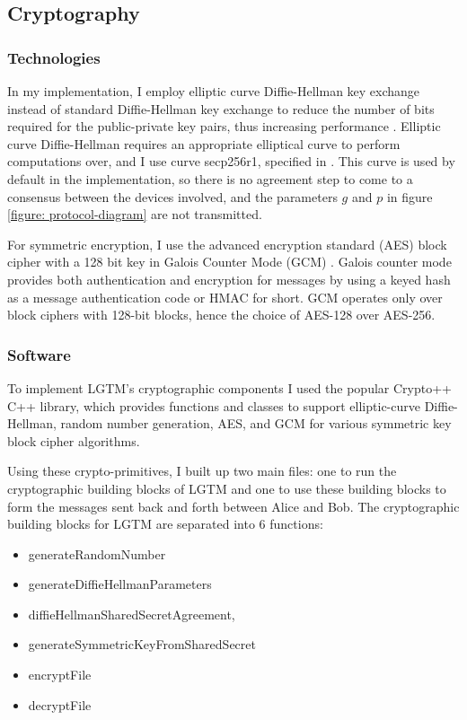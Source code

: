 \documentclass[12pt]{report}
\begin{document}
\subsection{Cryptography}
\subsubsection{Technologies}
In my implementation, I employ elliptic curve Diffie-Hellman key exchange instead of standard Diffie-Hellman key exchange to reduce the number of bits required for the public-private key pairs, thus increasing performance \cite{FastEllipticCurveDiffieHellmanBernstein2006}. Elliptic curve Diffie-Hellman requires an appropriate elliptical curve to perform computations over, and I use curve secp256r1, specified in \cite{EllipticCurvesStandard2009}. This curve is used by default in the implementation, so there is no agreement step to come to a consensus between the devices involved, and the parameters $g$ and $p$ in figure \ref{figure: protocol-diagram} are not transmitted. \par

For symmetric encryption, I use the advanced encryption standard (AES) block cipher with a 128 bit key \cite{AesNist2001} in Galois Counter Mode (GCM) \cite{GcmModeMcGrewNist2005}. Galois counter mode provides both authentication and encryption for messages by using a keyed hash as a message authentication code or HMAC for short. GCM operates only over block ciphers with 128-bit blocks, hence the choice of AES-128 over AES-256. \par

\subsubsection{Software}
To implement LGTM's cryptographic components I used the popular Crypto++ C++ library, which provides functions and classes to support elliptic-curve Diffie-Hellman, random number generation, AES, and GCM for various symmetric key block cipher algorithms. \par

Using these crypto-primitives, I built up two main files: one to run the cryptographic building blocks of LGTM and one to use these building blocks to form the messages sent back and forth between Alice and Bob. The cryptographic building blocks for LGTM are separated into 6 functions: 

\begin{itemize}
    \item generateRandomNumber
    \item generateDiffieHellmanParameters
    \item diffieHellmanSharedSecretAgreement, 
    \item generateSymmetricKeyFromSharedSecret
    \item encryptFile
    \item decryptFile
\end{itemize}
\end{document}
